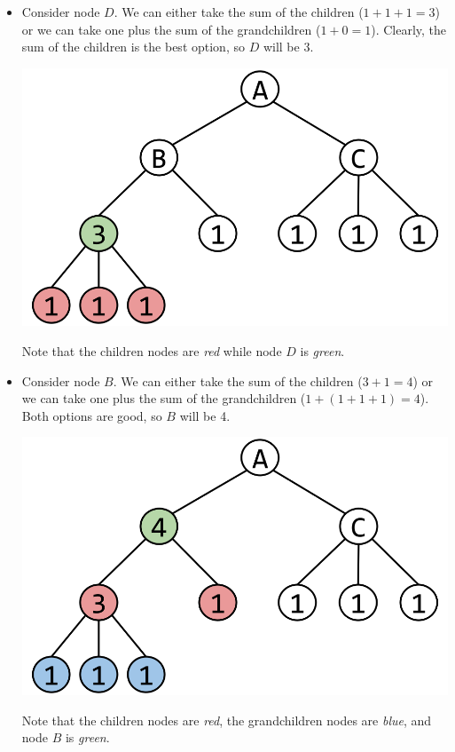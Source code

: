 \documentclass[letterpaper]{article}
\begin{document}
\begin{mdframed}[]
\begin{itemize}
        \item Consider node $D$. We can either take the sum of the children ($1 + 1 + 1 = 3$) or we can take one plus the sum of the grandchildren ($1 + 0 = 1$). Clearly, the sum of the children is the best option, so $D$ will be 3. 
        \begin{center}
            \includegraphics[scale=0.2]{../assets/indep_set_ex_2.png}
        \end{center}
        Note that the children nodes are \emph{red} while node $D$ is \emph{green}.

        \item Consider node $B$. We can either take the sum of the children ($3 + 1 = 4$) or we can take one plus the sum of the grandchildren ($1 + (1 + 1 + 1) = 4$). Both options are good, so $B$ will be 4. 
        \begin{center}
            \includegraphics[scale=0.2]{../assets/indep_set_ex_3.png}
        \end{center}
        Note that the children nodes are \emph{red}, the grandchildren nodes are \emph{blue}, and node $B$ is \emph{green}.


\end{itemize}
\end{mdframed}
\end{document}
